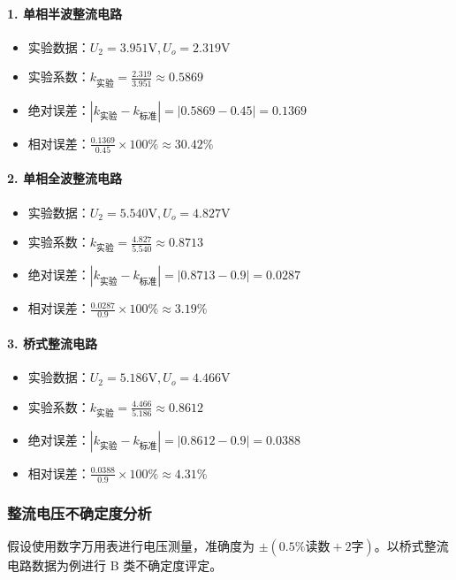 \documentclass[]{../../templates/Report}%
\begin{document}
\begin{fullreportonly}
\paragraph{1. 单相半波整流电路}
\begin{itemize}
    \item 实验数据：$U_2 = 3.951\text{V}, U_o = 2.319\text{V}$
    \item 实验系数：$k_{\text{实验}} = \frac{2.319}{3.951} \approx 0.5869$
    \item 绝对误差：$|k_{\text{实验}} - k_{\text{标准}}| = |0.5869 - 0.45| = 0.1369$
    \item 相对误差：$\frac{0.1369}{0.45} \times 100\% \approx 30.42\%$
\end{itemize}

\paragraph{2. 单相全波整流电路}
\begin{itemize}
    \item 实验数据：$U_2 = 5.540\text{V}, U_o = 4.827\text{V}$
    \item 实验系数：$k_{\text{实验}} = \frac{4.827}{5.540} \approx 0.8713$
    \item 绝对误差：$|k_{\text{实验}} - k_{\text{标准}}| = |0.8713 - 0.9| = 0.0287$
    \item 相对误差：$\frac{0.0287}{0.9} \times 100\% \approx 3.19\%$
\end{itemize}

\paragraph{3. 桥式整流电路}
\begin{itemize}
    \item 实验数据：$U_2 = 5.186\text{V}, U_o = 4.466\text{V}$
    \item 实验系数：$k_{\text{实验}} = \frac{4.466}{5.186} \approx 0.8612$
    \item 绝对误差：$|k_{\text{实验}} - k_{\text{标准}}| = |0.8612 - 0.9| = 0.0388$
    \item 相对误差：$\frac{0.0388}{0.9} \times 100\% \approx 4.31\%$
\end{itemize}

\subsubsection{整流电压不确定度分析}
假设使用数字万用表进行电压测量，准确度为 $\pm(0.5\% \text{读数} + 2\text{字})$。以桥式整流电路数据为例进行 B 类不确定度评定。


\end{fullreportonly}
\end{document}
